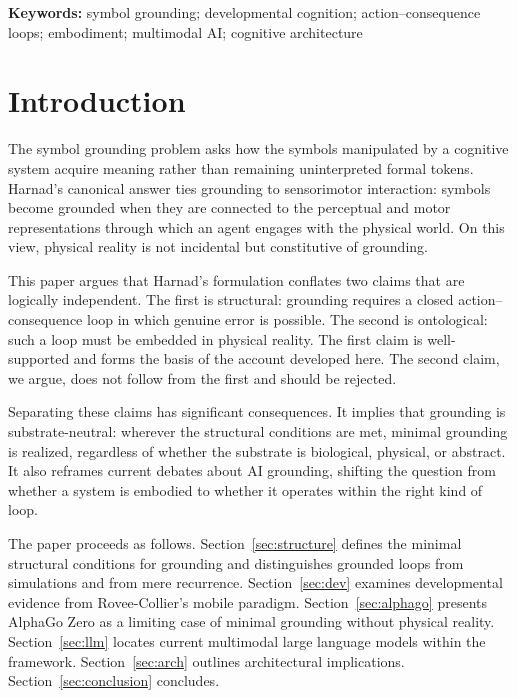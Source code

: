 \documentclass[11pt]{article}
\begin{document}
\bigskip
\noindent\textbf{Keywords:} symbol grounding; developmental cognition;
action--consequence loops; embodiment; multimodal AI; cognitive architecture

\newpage

\section{Introduction}

The symbol grounding problem \citep{Harnad1990} asks how the symbols
manipulated by a cognitive system acquire meaning rather than remaining
uninterpreted formal tokens. Harnad's canonical answer ties grounding
to sensorimotor interaction: symbols become grounded when they are
connected to the perceptual and motor representations through which an
agent engages with the physical world. On this view, physical reality
is not incidental but constitutive of grounding.

This paper argues that Harnad's formulation conflates two claims that
are logically independent. The first is structural: grounding requires
a closed action--consequence loop in which genuine error is possible.
The second is ontological: such a loop must be embedded in physical
reality. The first claim is well-supported and forms the basis of the
account developed here. The second claim, we argue, does not follow
from the first and should be rejected.

Separating these claims has significant consequences. It implies that
grounding is substrate-neutral: wherever the structural conditions are
met, minimal grounding is realized, regardless of whether the substrate
is biological, physical, or abstract. It also reframes current debates
about AI grounding, shifting the question from whether a system is
embodied to whether it operates within the right kind of loop.

The paper proceeds as follows. Section~\ref{sec:structure} defines the
minimal structural conditions for grounding and distinguishes grounded
loops from simulations and from mere recurrence. Section~\ref{sec:dev}
examines developmental evidence from Rovee-Collier's mobile paradigm.
Section~\ref{sec:alphago} presents AlphaGo Zero as a limiting case of
minimal grounding without physical reality. Section~\ref{sec:llm}
locates current multimodal large language models within the framework.
Section~\ref{sec:arch} outlines architectural implications.
Section~\ref{sec:conclusion} concludes.
\end{document}

